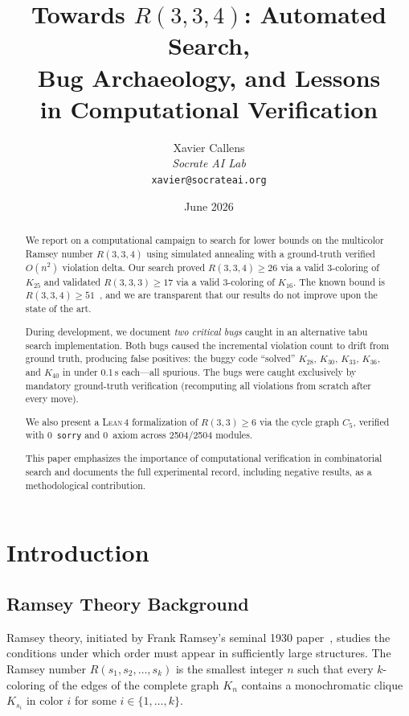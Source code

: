 \documentclass[11pt,a4paper]{article}
\title{%
  Towards $R(3,3,4)$: Automated Search,\\
  Bug Archaeology, and Lessons\\
  in Computational Verification}
\author{%
  Xavier Callens\\
  \textit{Socrate AI Lab}\\
  \texttt{xavier@socrateai.org}}
\date{June 2026}
\theoremstyle{definition}
\theoremstyle{remark}
\newcommand{\lean}{\textsc{Lean\,4}}
\newcommand{\sorry}{\texttt{sorry}}
\begin{document}
\maketitle

\begin{abstract}
We report on a computational campaign to search for lower bounds on the
multicolor Ramsey number $R(3,3,4)$ using simulated annealing with a
ground-truth verified $O(n^2)$ violation delta.
Our search proved $R(3,3,4) \ge 26$ via a valid 3-coloring of $K_{25}$
and validated $R(3,3,3) \ge 17$ via a valid 3-coloring of $K_{16}$.
The known bound is $R(3,3,4) \ge 51$~\cite{Piwakowski2000}, and we are
transparent that our results do not improve upon the state of the art.

During development, we document \emph{two critical bugs} caught in an
alternative tabu search implementation.  Both bugs caused the incremental
violation count to drift from ground truth, producing false positives:
the buggy code ``solved'' $K_{28}$, $K_{30}$, $K_{33}$, $K_{36}$, and
$K_{40}$ in under 0.1\,s each---all spurious.  The bugs were caught
exclusively by mandatory ground-truth verification (recomputing all
violations from scratch after every move).

We also present a \lean{} formalization of $R(3,3) \ge 6$ via the
cycle graph $C_5$, verified with 0~\sorry{} and 0~axiom across
2504/2504 modules.

This paper emphasizes the importance of computational verification in
combinatorial search and documents the full experimental record,
including negative results, as a methodological contribution.
\end{abstract}

\tableofcontents

\section{Introduction}\label{sec:intro}

\subsection{Ramsey Theory Background}

Ramsey theory, initiated by Frank Ramsey's seminal 1930
paper~\cite{Ramsey1930}, studies the conditions under which order must
appear in sufficiently large structures.
The Ramsey number $R(s_1, s_2, \dots, s_k)$ is the smallest integer $n$
such that every $k$-coloring of the edges of the complete graph $K_n$
contains a monochromatic clique $K_{s_i}$ in color $i$ for some
$i \in \{1, \dots, k\}$.
\end{document}

